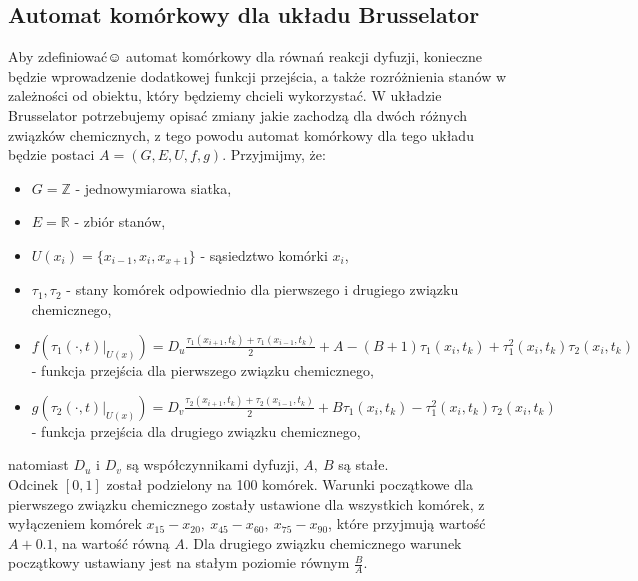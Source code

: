 \documentclass[a4paper,12pt]{article}
\begin{document}
\subsection{Automat komórkowy dla układu Brusselator}
Aby zdefiniować☺ automat komórkowy dla równań reakcji dyfuzji, konieczne będzie wprowadzenie dodatkowej funkcji przejścia, a także rozróżnienia stanów w zależności od obiektu, który będziemy chcieli wykorzystać. W układzie Brusselator potrzebujemy opisać zmiany jakie zachodzą dla dwóch różnych związków chemicznych, z tego powodu automat komórkowy dla tego układu będzie postaci $A=(G, E, U, f, g)$. Przyjmijmy, że:
\begin{itemize}
    \item $G=\mathbb{Z}$ - jednowymiarowa siatka,
    \item $E=\mathbb{R}$ - zbiór stanów,
    \item $U(x_i)= \{x_{i-1}, x_i,x_{x+1}\}$ - sąsiedztwo komórki $x_i$,
    \item $\tau_1,\tau_2$ - stany komórek odpowiednio dla pierwszego i drugiego związku chemicznego,
    \item $f(\tau_1(\cdot,t)|_{U(x)})= D_u\frac{\tau_1(x_{i + 1}, t_k)+\tau_1(x_{i-1},t_k) }{2} + A - (B+1)\tau_1(x_i,t_k) + \tau_1^2(x_i,t_k)\tau_2(x_i,t_k)$ - funkcja przejścia dla pierwszego związku chemicznego,
    \item $g(\tau_2(\cdot,t)|_{U(x)})= D_v\frac{\tau_2(x_{i + 1}, t_k)+\tau_2(x_{i-1},t_k) }{2} + B\tau_1(x_i,t_k) - \tau_1^2(x_i,t_k)\tau_2(x_i,t_k)$ - funkcja przejścia dla drugiego związku chemicznego,
\end{itemize}
natomiast $D_u$ i $D_v$ są współczynnikami dyfuzji, $A,\ B$ są stałe.\\
Odcinek $[0,1]$ został podzielony na 100 komórek. Warunki początkowe dla pierwszego związku chemicznego zostały ustawione dla wszystkich komórek, z wyłączeniem komórek $x_{15}-x_{20},\ x_{45}-x_{60},\ x_{75}-x_{90}$, które przyjmują wartość $A+0.1$, na wartość równą $A$. Dla drugiego związku chemicznego warunek początkowy ustawiany jest na stałym poziomie równym $\frac{B}{A}$.
\end{document}
